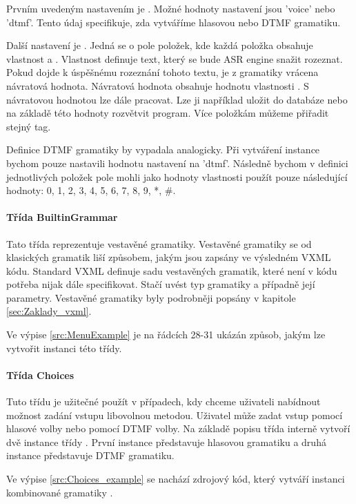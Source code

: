 \documentclass[ing,male,java,dept460]{diploma}						%
\begin{document}
Prvním uvedeným nastavením je . Možné hodnoty nastavení jsou 'voice' nebo 'dtmf'. Tento údaj specifikuje, zda vytváříme hlasovou nebo DTMF gramatiku.

Další nastavení je . Jedná se o pole položek, kde každá položka obsahuje vlastnost  a . Vlastnost  definuje text, který se bude ASR engine snažit rozeznat. Pokud dojde k úspěšnému rozeznání tohoto textu, je z gramatiky vrácena návratová hodnota. Návratová hodnota obsahuje hodnotu vlastnosti . S návratovou hodnotou lze dále pracovat. Lze ji například uložit do databáze nebo na základě této hodnoty rozvětvit program. Více položkám můžeme přiřadit stejný tag.

Definice DTMF gramatiky by vypadala analogicky. Při vytváření instance bychom pouze nastavili hodnotu nastavení  na 'dtmf'. Následně bychom v definici jednotlivých položek pole  mohli jako hodnoty vlastnosti  použít pouze následující hodnoty: 0, 1, 2, 3, 4, 5, 6, 7, 8, 9, *, \#.

\paragraph{Třída BuiltinGrammar}
\label{sec:BuiltinGrammar}
Tato třída reprezentuje vestavěné gramatiky. Vestavěné gramatiky se od klasických gramatik liší způsobem, jakým jsou zapsány ve výsledném VXML kódu. Standard VXML definuje sadu vestavěných gramatik, které není v kódu potřeba nijak dále specifikovat. Stačí uvést typ gramatiky a případně její parametry. Vestavěné gramatiky byly podrobněji popsány v kapitole \ref{sec:Zaklady_vxml}.

Ve výpise \ref{src:MenuExample} je na řádcích 28-31 ukázán způsob, jakým lze vytvořit instanci této třídy.

\paragraph{Třída Choices}
\label{sec:Choices}
Tuto třídu je užitečné použít v případech, kdy chceme uživateli nabídnout možnost zadání vstupu libovolnou metodou. Uživatel může zadat vstup pomocí hlasové volby nebo pomocí DTMF volby. Na základě popisu třída interně vytvoří dvě instance třídy . První instance představuje hlasovou gramatiku a druhá instance představuje DTMF gramatiku.

Ve výpise \ref{src:Choices_example} se nachází zdrojový kód, který vytváří instanci kombinované gramatiky .
\end{document}
